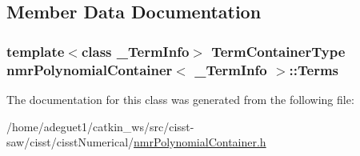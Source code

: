 \subsection{Member Data Documentation}
\hypertarget{classnmr_polynomial_container_a70c5e0c98f3a13222bb51bf855e6988a}{
\subsubsection[{Terms}]{\setlength{\rightskip}{0pt plus 5cm}template$<$class \-\_\-\-Term\-Info$>$ {\bf Term\-Container\-Type} {\bf nmr\-Polynomial\-Container}$<$ \-\_\-\-Term\-Info $>$\-::Terms\hspace{0.3cm}{\ttfamily [protected]}}}\label{classnmr_polynomial_container_a70c5e0c98f3a13222bb51bf855e6988a}


The documentation for this class was generated from the following file\-:\begin{DoxyCompactItemize}
\item 
/home/adeguet1/catkin\-\_\-ws/src/cisst-\/saw/cisst/cisst\-Numerical/\hyperlink{nmr_polynomial_container_8h}{nmr\-Polynomial\-Container.\-h}\end{DoxyCompactItemize}
